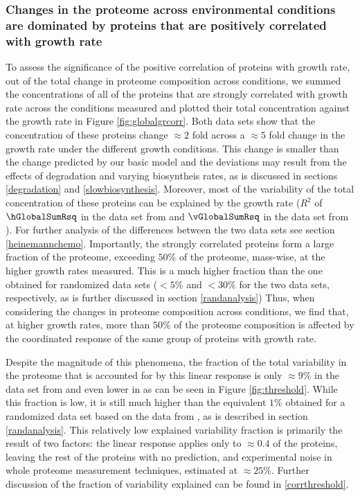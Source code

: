 \subsubsection{Changes in the proteome across environmental conditions are dominated by proteins that are positively correlated with growth rate}
To assess the significance of the positive correlation of proteins with growth rate, out of the total change in proteome composition across conditions, we summed the concentrations of all of the proteins that are strongly correlated with growth rate across the conditions measured and plotted their total concentration against the growth rate in Figure \ref{fig:globalgrcorr}.
Both data sets show that the concentration of these proteins change $\approx 2$ fold across a $\approx 5$ fold change in the growth rate under the different growth conditions.
This change is smaller than the change predicted by our basic model and the deviations may result from the effects of degradation and varying biosyntheis rates, as is discussed in sections \ref{degradation} and \ref{slowbiosynthesis}.
Moreover, most of the variability of the total concentration of these proteins can be explained by the growth rate ($R^2$ of $\hGlobalSumRsq$ in the data set from \cite{Heinemann2015} and $\vGlobalSumRsq$ in the data set from \cite{Valgepea2013}). 
For further analysis of the differences between the two data sets see section \ref{heinemannchemo}.
Importantly, the strongly correlated proteins form a large fraction of the proteome, exceeding $50\%$ of the proteome, mass-wise, at the higher growth rates measured.
This is a much higher fraction than the one obtained for randomized data sets ($\lt5\%$ and $\lt 30\%$ for the two data sets, respectively, as is further discussed in section \ref{randanalysis})
Thus, when considering the changes in proteome composition across conditions, we find that, at higher growth rates, more than $50\%$ of the proteome composition is affected by the coordinated response of the same group of proteins with growth rate.

Despite the magnitude of this phenomena, the fraction of the total variability in the proteome that is accounted for by this linear response is only $\approx 9\%$  in the data set from \cite{Heinemann2015} and even lower in \cite{Valgepea2013} as can be seen in Figure \ref{fig:threshold}.
While this fraction is low, it is still much higher than the equivalent $1\%$ obtained for a randomized data set based on the data from \cite{Heinemann2015}, as is described in section \ref{randanalysis}.
This relatively low explained variability fraction is primarily the result of two factors: the linear response applies only to $\approx0.4$ of the proteins, leaving the rest of the proteins with no prediction, and experimental noise in whole proteome measurement techniques, estimated at $\approx25\%$.
Further discussion of the fraction of variability explained can be found in \ref{corrthreshold}.